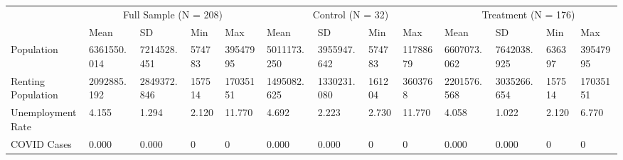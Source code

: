 \begin{tabular}{lllllllllllll}
\toprule
 & \multicolumn{4}{c}{Full Sample (N = 208)} & \multicolumn{4}{c}{Control (N = 32)} & \multicolumn{4}{c}{Treatment (N = 176)} \\
 & Mean & SD & Min & Max & Mean & SD & Min & Max & Mean & SD & Min & Max \\
\midrule
Population & 6361550.014 & 7214528.451 & 574783 & 39547995 & 5011173.250 & 3955947.642 & 574783 & 11788679 & 6607073.062 & 7642038.925 & 636397 & 39547995 \\
Renting Population & 2092885.192 & 2849372.846 & 157514 & 17035151 & 1495082.625 & 1330231.080 & 161204 & 3603768 & 2201576.568 & 3035266.654 & 157514 & 17035151 \\
Unemployment Rate & 4.155 & 1.294 & 2.120 & 11.770 & 4.692 & 2.223 & 2.730 & 11.770 & 4.058 & 1.022 & 2.120 & 6.770 \\
COVID Cases & 0.000 & 0.000 & 0 & 0 & 0.000 & 0.000 & 0 & 0 & 0.000 & 0.000 & 0 & 0 \\
\bottomrule
\end{tabular}
